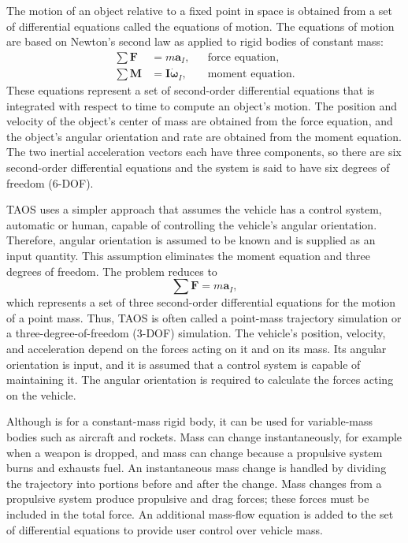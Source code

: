 The motion of an object relative to a fixed point in space is obtained from a set of
differential equations called the equations of motion. The equations of motion are
based on Newton's second law as applied to rigid bodies of constant mass:
\begin{equation}
  \begin{aligned}
    \sum \mathbf{F} &= m\mathbf{a}_{I}, &&\text{force equation},\\
    \sum \mathbf{M} &= \mathbf{I}\dot{\boldsymbol{\omega}}_{I}, &&\text{moment equation}.
  \end{aligned}
  \label{eq:force-equation}
\end{equation}
These equations represent a set of second-order differential equations that is
integrated with respect to time to compute an object's motion. The position and
velocity of the object's center of mass are obtained from the force equation, and the
object's angular orientation and rate are obtained from the moment equation. The two
inertial acceleration vectors each have three components, so there are six
second-order differential equations and the system is said to have six degrees of
freedom (6-DOF).

TAOS uses a simpler approach that assumes the vehicle has a control system,
automatic or human, capable of controlling the vehicle's angular orientation.
Therefore, angular orientation is assumed to be known and is supplied as an input
quantity. This assumption eliminates the moment equation and three degrees of
freedom. The problem reduces to
\begin{equation}
  \sum \mathbf{F}=m\mathbf{a}_{I},
  \label{eq:point-mass-force}
\end{equation}
which represents a set of three second-order differential equations for the motion of
a point mass. Thus, TAOS is often called a point-mass trajectory simulation or a
three-degree-of-freedom (3-DOF) simulation. The vehicle's position, velocity, and
acceleration depend on the forces acting on it and on its mass. Its angular orientation
is input, and it is assumed that a control system is capable of maintaining it. The
angular orientation is required to calculate the forces acting on the vehicle.

Although  is for a constant-mass rigid body, it can be used
for variable-mass bodies such as aircraft and rockets. Mass can change
instantaneously, for example when a weapon is dropped, and mass can change because
a propulsive system burns and exhausts fuel. An instantaneous mass change is handled
by dividing the trajectory into portions before and after the change. Mass changes
from a propulsive system produce propulsive and drag forces; these forces must be
included in the total force. An additional mass-flow equation is added to the set of
differential equations to provide user control over vehicle mass.

